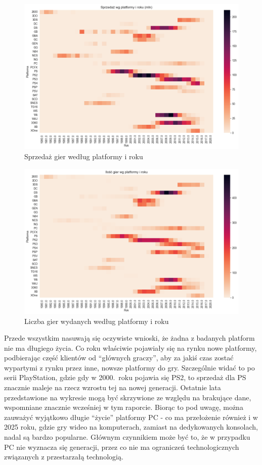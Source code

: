 \documentclass[11pt]{article}
\begin{document}
\begin{figure}[H]
    \centering
    \includegraphics[width=\linewidth]{figures/rokplatforma-sprzedaz}
    \caption{Sprzedaż gier według platformy i roku}
    \label{fig:platform-year-sales}
\end{figure}

\begin{figure}[H]
    \centering
    \includegraphics[width=\linewidth]{figures/rokplatforma-ilosc}
    \caption{Liczba gier wydanych według platformy i roku}
    \label{fig:platform-year-count}
\end{figure}

Przede wszystkim nasuwają się oczywiste wnioski, że żadna z badanych platform nie ma długiego życia.
Co roku właściwie pojawiały się na rynku nowe platformy, podbierając część klientów od ``głównych graczy'', aby za jakiś czas zostać wypartymi z rynku przez inne, nowsze platformy do gry.
Szczególnie widać to po serii PlayStation, gdzie gdy w 2000.~roku pojawia się PS2, to sprzedaż dla PS znacznie maleje na rzecz wzrostu tej na nowej generacji.
Ostatnie lata przedstawione na wykresie mogą być skrzywione ze względu na brakujące dane, wspomniane znacznie wcześniej w tym raporcie.
Biorąc to pod uwagę, można zauważyć wyjątkowo długie ``życie'' platformy PC - co ma przełożenie również i w 2025 roku, gdzie gry wideo na komputerach, zamiast na dedykowanych konsolach, nadal są bardzo popularne.
Głównym czynnikiem może być to, że w przypadku PC nie wyznacza się generacji, przez co nie ma ograniczeń technologicznych związanych z przestarzałą technologią.
\end{document}
